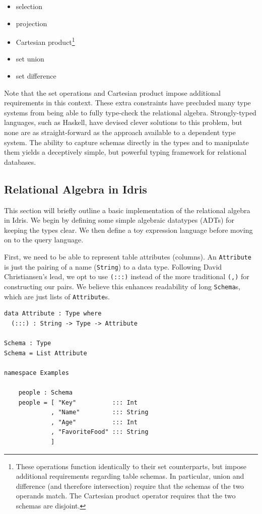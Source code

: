 \documentclass[12pt]{article}
\begin{document}
\begin{itemize}
    \item selection
    \item projection
    \item Cartesian product\footnote{\label{fn:set_ops} These operations function identically to their set counterparts, but impose additional requirements regarding table schemas. In particular, union and difference (and therefore intersection) require that the schemas of the two operands match. The Cartesian product operator requires that the two schemas are disjoint.}
    \item set union\footnotemark[\ref{fn:set_ops}]
    \item set difference\footnotemark[\ref{fn:set_ops}]
\end{itemize}

Note that the set operations and Cartesian product impose additional requirements in this context.
These extra constraints have precluded many type systems from being able to fully type-check the relational algebra.
Strongly-typed languages, such as Haskell, have devised clever solutions to this problem, but none are as straight-forward as the approach available to a dependent type system.
The ability to capture schemas directly in the types and to manipulate them yields a deceptively simple, but powerful typing framework for relational databases.

\subsection{Relational Algebra in Idris}

This section will briefly outline a basic implementation of the relational algebra in Idris.
We begin by defining some simple algebraic datatypes (ADTs) for keeping the types clear.
We then define a toy expression language before moving on to the query language.

First, we need to be able to represent table attributes (columns).
An \texttt{Attribute} is just the pairing of a name (\texttt{String}) to a data type.
Following David Christiansen's lead, we opt to use \texttt{(:::)} instead of the more traditional \texttt{(,)} for constructing our pairs.
We believe this enhances readability of long \texttt{Schema}s, which are just lists of \texttt{Attribute}s.

\begin{lstlisting}
data Attribute : Type where
  (:::) : String -> Type -> Attribute

Schema : Type
Schema = List Attribute

namespace Examples

    people : Schema
    people = [ "Key"          ::: Int 
             , "Name"         ::: String
             , "Age"          ::: Int
             , "FavoriteFood" ::: String
             ]
\end{lstlisting}
\end{document}
